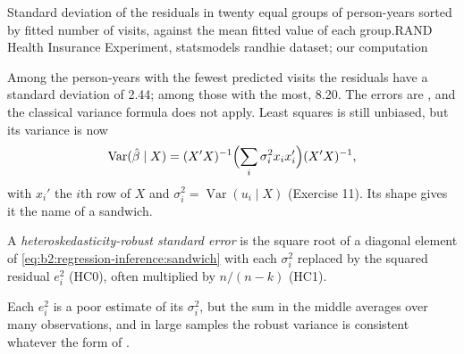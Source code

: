 \begin{omchart}{Standard deviation of the residuals in twenty equal groups of person-years sorted by fitted number of
  visits, against the mean fitted value of each group.}{RAND Health Insurance Experiment, statsmodels randhie dataset; our
  computation}
\end{omchart}

Among the person-years with the fewest predicted visits the residuals have a standard deviation of 2.44; among those with
the most, 8.20. The errors are , and the classical variance formula does not apply. Least squares is still
unbiased, but its variance is now
\begin{equation}\label{eq:b2:regression-inference:sandwich}
\operatorname{Var}(\hat\beta \mid X) = (X'X)^{-1}\Bigl(\sum_i\sigma_i^2x_ix_i'\Bigr)(X'X)^{-1},
\end{equation}
with $x_i'$ the $i$th row of $X$ and $\sigma_i^2 = \operatorname{Var}(u_i \mid X)$ (Exercise 11). Its shape gives it the
name of a sandwich.

\begin{definition}\label{def:b2:regression-inference:robust-se}
A \emph{heteroskedasticity-robust standard error} is the square root of a
diagonal element of \eqref{eq:b2:regression-inference:sandwich} with each $\sigma_i^2$ replaced by the squared residual
$e_i^2$ (HC0), often multiplied by $n/(n - k)$ (HC1).
\end{definition}

Each $e_i^2$ is a poor estimate of its $\sigma_i^2$, but the sum in the middle averages over many observations, and in
large samples the robust variance is consistent whatever the form of .

\label{lst:b2:regression-inference:robust}

